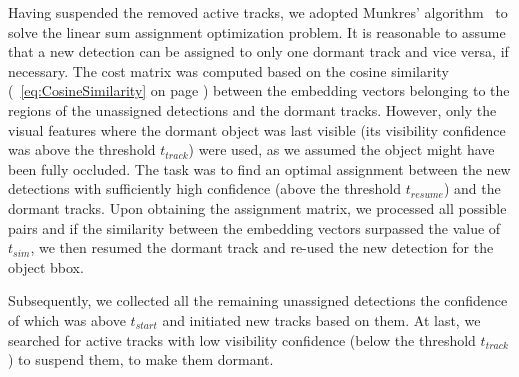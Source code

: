 Having suspended the removed active tracks, we adopted Munkres' algorithm~\cite{munkres1957assignment} to solve the linear sum assignment optimization problem. It is reasonable to assume that a new detection can be assigned to only one dormant track and vice versa, if necessary. The cost matrix was computed based on the cosine similarity (\eqtext{}~\ref{eq:CosineSimilarity} on page \pageref{eq:CosineSimilarity}) between the embedding vectors belonging to the regions of the unassigned detections and the dormant tracks. However, only the visual features where the dormant object was last visible (its visibility confidence was above the threshold $t_{track}$) were used, as we assumed the object might have been fully occluded. The task was to find an optimal assignment between the new detections with sufficiently high confidence (above the threshold $t_{resume}$) and the dormant tracks. Upon obtaining the assignment matrix, we processed all possible pairs and if the similarity between the embedding vectors surpassed the value of $t_{sim}$, we then resumed the dormant track and re-used the new detection for the object \gls{bbox}.

Subsequently, we collected all the remaining unassigned detections the confidence of which was above $t_{start}$ and initiated new tracks based on them. At last, we searched for active tracks with low visibility confidence (below the threshold $t_{track}$) to suspend them, to make them dormant.


